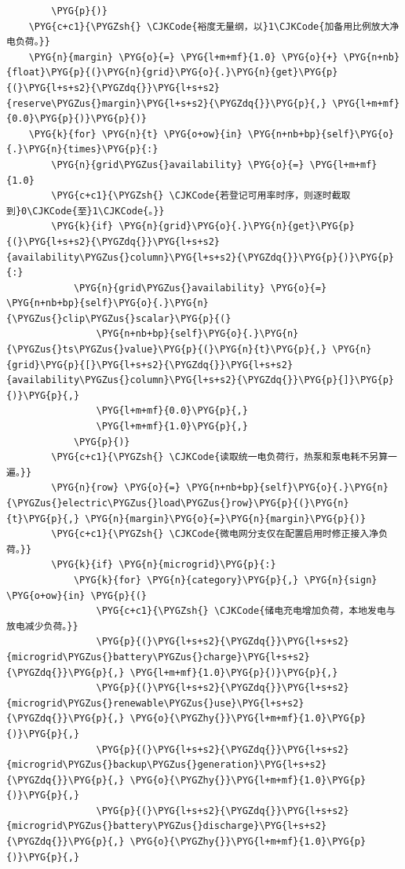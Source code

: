 \begin{Verbatim}
        \PYG{p}{)}
    \PYG{c+c1}{\PYGZsh{} \CJKCode{裕度无量纲，以}1\CJKCode{加备用比例放大净电负荷。}}
    \PYG{n}{margin} \PYG{o}{=} \PYG{l+m+mf}{1.0} \PYG{o}{+} \PYG{n+nb}{float}\PYG{p}{(}\PYG{n}{grid}\PYG{o}{.}\PYG{n}{get}\PYG{p}{(}\PYG{l+s+s2}{\PYGZdq{}}\PYG{l+s+s2}{reserve\PYGZus{}margin}\PYG{l+s+s2}{\PYGZdq{}}\PYG{p}{,} \PYG{l+m+mf}{0.0}\PYG{p}{)}\PYG{p}{)}
    \PYG{k}{for} \PYG{n}{t} \PYG{o+ow}{in} \PYG{n+nb+bp}{self}\PYG{o}{.}\PYG{n}{times}\PYG{p}{:}
        \PYG{n}{grid\PYGZus{}availability} \PYG{o}{=} \PYG{l+m+mf}{1.0}
        \PYG{c+c1}{\PYGZsh{} \CJKCode{若登记可用率时序，则逐时截取到}0\CJKCode{至}1\CJKCode{。}}
        \PYG{k}{if} \PYG{n}{grid}\PYG{o}{.}\PYG{n}{get}\PYG{p}{(}\PYG{l+s+s2}{\PYGZdq{}}\PYG{l+s+s2}{availability\PYGZus{}column}\PYG{l+s+s2}{\PYGZdq{}}\PYG{p}{)}\PYG{p}{:}
            \PYG{n}{grid\PYGZus{}availability} \PYG{o}{=} \PYG{n+nb+bp}{self}\PYG{o}{.}\PYG{n}{\PYGZus{}clip\PYGZus{}scalar}\PYG{p}{(}
                \PYG{n+nb+bp}{self}\PYG{o}{.}\PYG{n}{\PYGZus{}ts\PYGZus{}value}\PYG{p}{(}\PYG{n}{t}\PYG{p}{,} \PYG{n}{grid}\PYG{p}{[}\PYG{l+s+s2}{\PYGZdq{}}\PYG{l+s+s2}{availability\PYGZus{}column}\PYG{l+s+s2}{\PYGZdq{}}\PYG{p}{]}\PYG{p}{)}\PYG{p}{,}
                \PYG{l+m+mf}{0.0}\PYG{p}{,}
                \PYG{l+m+mf}{1.0}\PYG{p}{,}
            \PYG{p}{)}
        \PYG{c+c1}{\PYGZsh{} \CJKCode{读取统一电负荷行，热泵和泵电耗不另算一遍。}}
        \PYG{n}{row} \PYG{o}{=} \PYG{n+nb+bp}{self}\PYG{o}{.}\PYG{n}{\PYGZus{}electric\PYGZus{}load\PYGZus{}row}\PYG{p}{(}\PYG{n}{t}\PYG{p}{,} \PYG{n}{margin}\PYG{o}{=}\PYG{n}{margin}\PYG{p}{)}
        \PYG{c+c1}{\PYGZsh{} \CJKCode{微电网分支仅在配置启用时修正接入净负荷。}}
        \PYG{k}{if} \PYG{n}{microgrid}\PYG{p}{:}
            \PYG{k}{for} \PYG{n}{category}\PYG{p}{,} \PYG{n}{sign} \PYG{o+ow}{in} \PYG{p}{(}
                \PYG{c+c1}{\PYGZsh{} \CJKCode{储电充电增加负荷，本地发电与放电减少负荷。}}
                \PYG{p}{(}\PYG{l+s+s2}{\PYGZdq{}}\PYG{l+s+s2}{microgrid\PYGZus{}battery\PYGZus{}charge}\PYG{l+s+s2}{\PYGZdq{}}\PYG{p}{,} \PYG{l+m+mf}{1.0}\PYG{p}{)}\PYG{p}{,}
                \PYG{p}{(}\PYG{l+s+s2}{\PYGZdq{}}\PYG{l+s+s2}{microgrid\PYGZus{}renewable\PYGZus{}use}\PYG{l+s+s2}{\PYGZdq{}}\PYG{p}{,} \PYG{o}{\PYGZhy{}}\PYG{l+m+mf}{1.0}\PYG{p}{)}\PYG{p}{,}
                \PYG{p}{(}\PYG{l+s+s2}{\PYGZdq{}}\PYG{l+s+s2}{microgrid\PYGZus{}backup\PYGZus{}generation}\PYG{l+s+s2}{\PYGZdq{}}\PYG{p}{,} \PYG{o}{\PYGZhy{}}\PYG{l+m+mf}{1.0}\PYG{p}{)}\PYG{p}{,}
                \PYG{p}{(}\PYG{l+s+s2}{\PYGZdq{}}\PYG{l+s+s2}{microgrid\PYGZus{}battery\PYGZus{}discharge}\PYG{l+s+s2}{\PYGZdq{}}\PYG{p}{,} \PYG{o}{\PYGZhy{}}\PYG{l+m+mf}{1.0}\PYG{p}{)}\PYG{p}{,}

\end{Verbatim}

